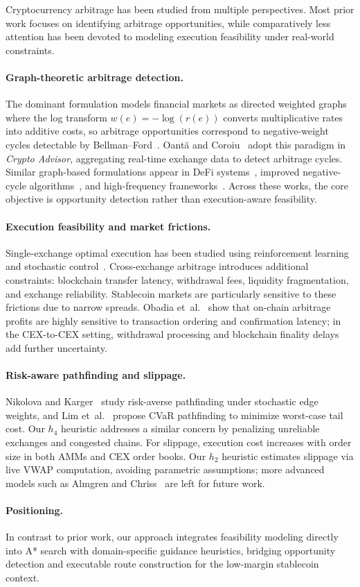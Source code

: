 Cryptocurrency arbitrage has been studied from multiple perspectives. Most prior work focuses on identifying arbitrage opportunities, while comparatively less attention has been devoted to modeling execution feasibility under real-world constraints.

\paragraph{Graph-theoretic arbitrage detection.}
The dominant formulation models financial markets as directed weighted graphs where the log transform $w(e)=-\log(r(e))$ converts multiplicative rates into additive costs, so arbitrage opportunities correspond to negative-weight cycles detectable by Bellman--Ford~\cite{bellman1958routing,cormen2009introduction}. Oant\u{a} and Coroiu~\cite{oanta2023crypto} adopt this paradigm in \emph{Crypto Advisor}, aggregating real-time exchange data to detect arbitrage cycles. Similar graph-based formulations appear in DeFi systems~\cite{defiposer2021}, improved negative-cycle algorithms~\cite{mmbf2024,rich2025}, and high-frequency frameworks~\cite{fang2022cryptocurrency}. Across these works, the core objective is opportunity detection rather than execution-aware feasibility.

\paragraph{Execution feasibility and market frictions.}
Single-exchange optimal execution has been studied using reinforcement learning and stochastic control~\cite{kearns2006reinforcement,optimalexecution2024}. Cross-exchange arbitrage introduces additional constraints: blockchain transfer latency, withdrawal fees, liquidity fragmentation, and exchange reliability. Stablecoin markets are particularly sensitive to these frictions due to narrow spreads. Obadia et~al.~\cite{obadia2021flashbots} show that on-chain arbitrage profits are highly sensitive to transaction ordering and confirmation latency; in the CEX-to-CEX setting, withdrawal processing and blockchain finality delays add further uncertainty.

\paragraph{Risk-aware pathfinding and slippage.}
Nikolova and Karger~\cite{nikolova2008stochastic} study risk-averse pathfinding under stochastic edge weights, and Lim et~al.~\cite{lim2022cvar} propose CVaR pathfinding to minimize worst-case tail cost. Our $h_4$ heuristic addresses a similar concern by penalizing unreliable exchanges and congested chains. For slippage, execution cost increases with order size in both AMMs and CEX order books. Our $h_2$ heuristic estimates slippage via live VWAP computation, avoiding parametric assumptions; more advanced models such as Almgren and Chriss~\cite{almgren2001optimal} are left for future work.

\paragraph{Positioning.}
In contrast to prior work, our approach integrates feasibility modeling directly into A* search with domain-specific guidance heuristics, bridging opportunity detection and executable route construction for the low-margin stablecoin context.
